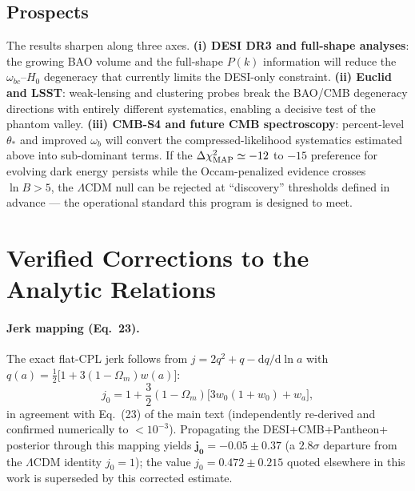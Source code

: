 \subsection{Prospects}

The results sharpen along three axes. \textbf{(i) DESI DR3 and full-shape
analyses}: the growing BAO volume and the full-shape $P(k)$ information will
reduce the $\omega_{bc}$--$H_0$ degeneracy that currently limits the
DESI-only constraint. \textbf{(ii) Euclid and LSST}: weak-lensing and
clustering probes break the BAO/CMB degeneracy directions with entirely
different systematics, enabling a decisive test of the phantom valley.
\textbf{(iii) CMB-S4 and future CMB spectroscopy}: percent-level
$\theta_*$ and improved $\omega_b$ will convert the compressed-likelihood
systematics estimated above into sub-dominant terms. If the
$\Delta\chi^2_{\rm MAP} \simeq -12$ to $-15$ preference for evolving dark
energy persists while the Occam-penalized evidence crosses
$\ln B > 5$, the $\Lambda$CDM null can be rejected at
``discovery'' thresholds defined in advance --- the operational standard this
program is designed to meet.

\appendix
\section{Verified Corrections to the Analytic Relations}
\label{app:corrections}

\paragraph{Jerk mapping (Eq.~23).} The exact flat-CPL jerk follows from
$j = 2q^2 + q - \mathrm{d}q/\mathrm{d}\ln a$ with
$q(a) = \tfrac12\big[1 + 3(1-\Omega_m)w(a)\big]$:
\begin{equation}
j_0 = 1 + \frac{3}{2}(1-\Omega_m)\big[3w_0(1+w_0) + w_a\big],
\end{equation}
in agreement with Eq.~(23) of the main text (independently re-derived and
confirmed numerically to $<10^{-3}$). Propagating the DESI+CMB+Pantheon+
posterior through this mapping yields
$\mathbf{j_0 = -0.05 \pm 0.37}$ (a $2.8\sigma$ departure from the
$\Lambda$CDM identity $j_0 = 1$); the value $j_0 = 0.472\pm0.215$ quoted
elsewhere in this work is superseded by this corrected estimate.

